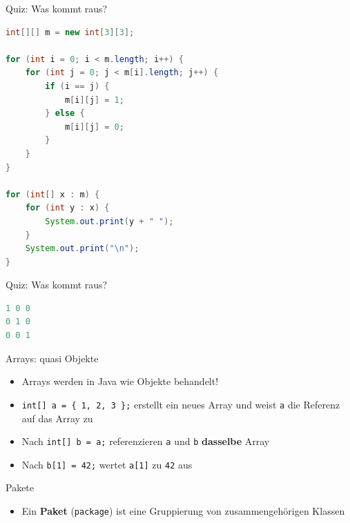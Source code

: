 \documentclass[18pt]{beamer}
\begin{document}
\begin{frame}[fragile]{Quiz: Was kommt raus?}
    \begin{exampleblock}{}
        \begin{lstlisting}[language=Java,basicstyle=\scriptsize]
int[][] m = new int[3][3];

for (int i = 0; i < m.length; i++) {
    for (int j = 0; j < m[i].length; j++) {
        if (i == j) {
            m[i][j] = 1;
        } else {
            m[i][j] = 0;
        }
    }
}

for (int[] x : m) {
    for (int y : x) {
        System.out.print(y + " ");
    }
    System.out.print("\n");
}
        \end{lstlisting}
    \end{exampleblock}
\end{frame}

\begin{frame}[fragile]{Quiz: Was kommt raus?}
    \begin{block}{}
        \begin{lstlisting}[language=Java]
1 0 0
0 1 0
0 0 1
        \end{lstlisting}
    \end{block}
\end{frame}

\begin{frame}{Arrays: quasi Objekte}
    \begin{itemize}
        \item Arrays werden in Java wie Objekte behandelt!
        \item \texttt{int[] a = \{ 1, 2, 3 \};} erstellt ein neues Array und weist \texttt{a} die Referenz auf das Array zu
        \item Nach \texttt{int[] b = a;} referenzieren \texttt{a} und \texttt{b} \textbf{dasselbe} Array
        \item Nach \texttt{b[1] = 42;} wertet \texttt{a[1]} zu \texttt{42} aus
    \end{itemize}
\end{frame}

\appendix

\beginbackup

\begin{frame}{Pakete}
    \begin{itemize}
        \item Ein \textbf{Paket} (\texttt{package}) ist eine Gruppierung von zusammengehörigen Klassen
    \end{itemize}
\end{frame}
\end{document}
